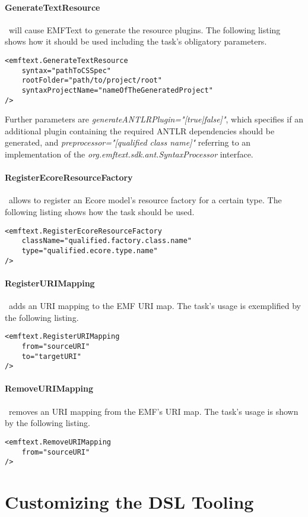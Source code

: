 \paragraph*{GenerateTextResource}~will cause EMFText to generate the resource
plugins. The following listing shows how it should be used including the task's obligatory parameters.
\begin{lstlisting}
<emftext.GenerateTextResource
	syntax="pathToCSSpec"
	rootFolder="path/to/project/root"
	syntaxProjectName="nameOfTheGeneratedProject"
/>
\end{lstlisting}
Further parameters are \emph{generateANTLRPlugin="[true|false]"}, which specifies if an additional plugin
containing the required ANTLR dependencies should be generated, and \emph{preprocessor="[qualified class name]"}
referring to an implementation of the \emph{org.emftext.sdk.ant.Syntax\-Processor} interface. 
\paragraph*{RegisterEcoreResourceFactory}~allows to register an Ecore model's resource factory for a 
certain type. The following listing shows how the task should be used.
\begin{lstlisting}
<emftext.RegisterEcoreResourceFactory
	className="qualified.factory.class.name"
	type="qualified.ecore.type.name"
/>
\end{lstlisting}
\paragraph*{RegisterURIMapping}~adds an URI mapping to the EMF URI map. The task's usage is exemplified by the 
following listing.
\begin{lstlisting}
<emftext.RegisterURIMapping
	from="sourceURI"
	to="targetURI"
/>
\end{lstlisting}
\paragraph*{RemoveURIMapping}~removes an URI mapping from the EMF's URI map. The task's usage is shown by the
following listing. 
\begin{lstlisting}
<emftext.RemoveURIMapping
	from="sourceURI"
/>
\end{lstlisting}
\section{Customizing the DSL Tooling}

